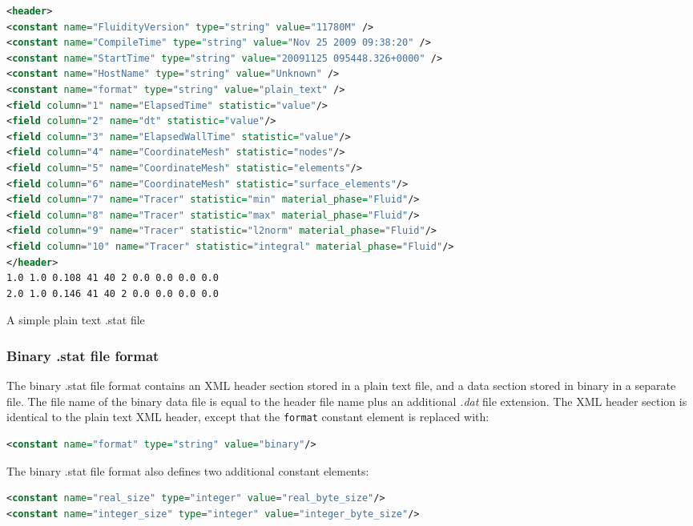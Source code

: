 \begin{example}
\begin{lstlisting}[language = XML]
<header>
<constant name="FluidityVersion" type="string" value="11780M" />
<constant name="CompileTime" type="string" value="Nov 25 2009 09:38:20" />
<constant name="StartTime" type="string" value="20091125 095448.326+0000" />
<constant name="HostName" type="string" value="Unknown" />
<constant name="format" type="string" value="plain_text" />
<field column="1" name="ElapsedTime" statistic="value"/>
<field column="2" name="dt" statistic="value"/>
<field column="3" name="ElapsedWallTime" statistic="value"/>
<field column="4" name="CoordinateMesh" statistic="nodes"/>
<field column="5" name="CoordinateMesh" statistic="elements"/>
<field column="6" name="CoordinateMesh" statistic="surface_elements"/>
<field column="7" name="Tracer" statistic="min" material_phase="Fluid"/>
<field column="8" name="Tracer" statistic="max" material_phase="Fluid"/>
<field column="9" name="Tracer" statistic="l2norm" material_phase="Fluid"/>
<field column="10" name="Tracer" statistic="integral" material_phase="Fluid"/>
</header>
1.0 1.0 0.108 41 40 2 0.0 0.0 0.0 0.0
2.0 1.0 0.146 41 40 2 0.0 0.0 0.0 0.0
\end{lstlisting}
\caption{A simple plain text .stat file}
\end{example}

\subsubsection{Binary .stat file format}

The binary .stat file format contains an XML header section stored in a plain
text file, and a data section stored in binary in
a separate file. The file name of the binary data file is equal to the
header file name plus an additional \textit{.dat} file extension. The XML
header section is identical to the plain text XML header, except that the
\lstinline[language = XML]*format* constant element is replaced with:

\begin{lstlisting}[language = XML]
<constant name="format" type="string" value="binary"/>
\end{lstlisting}

The binary .stat file format also defines two additional constant elements:

\begin{lstlisting}[language = XML]
<constant name="real_size" type="integer" value="real_byte_size"/>
<constant name="integer_size" type="integer" value="integer_byte_size"/>
\end{lstlisting}

